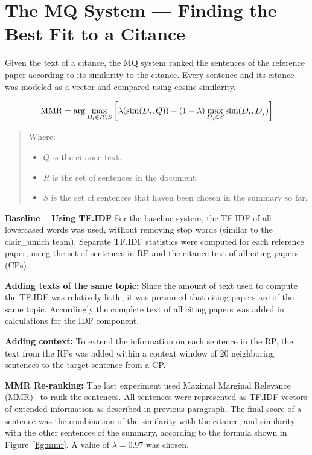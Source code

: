 \documentclass[11pt]{article}
\begin{document}

\section{The MQ System --- Finding the Best Fit to a Citance}
\label{s:mq}
Given the text of a citance, the MQ system ranked the sentences of the reference paper 
according to its similarity to the citance. Every sentence and its citance was modeled 
as a vector and compared using cosine similarity. 

\begin{figure*}
$$
\hbox{MMR} = \arg\max_{D_i\in R\setminus S}\left[\lambda(\hbox{sim}(D_i,Q)) -
(1-\lambda) \max_{D_j\in S} \hbox{sim}(D_i,D_j)\right]
$$  
\begin{quote}
Where:
\begin{itemize}
\item $Q$ is the citance text.
\item $R$ is the set of sentences in the document.
\item $S$ is the set of sentences that haven been chosen in the
  summary so far.  
\end{itemize}
\end{quote}
  \caption{Maximal Marginal Relevance (MMR) algorithm, as used in the {\it MQ} system.}
  \label{fig:mmr}
\end{figure*}

\textbf{Baseline -- Using TF.IDF}
For the baseline system, the TF.IDF of all lowercased words was used, 
without removing stop words (similar to the clair\_umich team). 
Separate TF.IDF statistics were computed for each reference paper, 
using the set of sentences in RP and the citance text of all 
citing papers (CPs).

\textbf{Adding texts of the same topic:}
Since the amount of text used to compute the TF.IDF was relatively little, 
it was presumed that citing papers are of the same topic. Accordingly the 
complete text of all citing papers was added in calculations for the IDF 
component.

\textbf{Adding context:}
To extend the information on each sentence in the RP,
the text from the RPs was added within a context window of 
20 neighboring sentences to the target sentence from a CP. 

\textbf{MMR Re-ranking:}
The last experiment used Maximal Marginal Relevance (MMR)~\cite{Carbonell:1998} 
to rank the sentences. All sentences were represented as TF.IDF vectors of 
extended information as described in previous paragraph. The final score 
of a sentence was the combination of the similarity with the citance, and 
similarity with the other sentences of the summary, according to the formula 
shown in Figure~\ref{fig:mmr}. A value of $\lambda=0.97$ was chosen.
\end{document}
